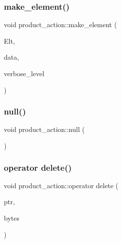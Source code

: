 \mbox{\label{classproduct__action_a1d16f9f3a4be7b3ed6ce0825612a3cd8}} 
\subsubsection{\texorpdfstring{make\+\_\+element()}{make\_element()}}
{\footnotesize\ttfamily void product\+\_\+action\+::make\+\_\+element (\begin{DoxyParamCaption}\item[{\mbox{\hyperlink{galois_8h_a09fddde158a3a20bd2dcadb609de11dc}{I\+NT}} $\ast$}]{Elt,  }\item[{\mbox{\hyperlink{galois_8h_a09fddde158a3a20bd2dcadb609de11dc}{I\+NT}} $\ast$}]{data,  }\item[{\mbox{\hyperlink{galois_8h_a09fddde158a3a20bd2dcadb609de11dc}{I\+NT}}}]{verbose\+\_\+level }\end{DoxyParamCaption})}

\mbox{\label{classproduct__action_a5a8a4c983398ab1ff4fcd6bd30d17a31}} 
\subsubsection{\texorpdfstring{null()}{null()}}
{\footnotesize\ttfamily void product\+\_\+action\+::null (\begin{DoxyParamCaption}{ }\end{DoxyParamCaption})}

\mbox{\label{classproduct__action_a576a86e22cae457ec3b34f5f7e927d13}} 
\subsubsection{\texorpdfstring{operator delete()}{operator delete()}}
{\footnotesize\ttfamily void product\+\_\+action\+::operator delete (\begin{DoxyParamCaption}\item[{void $\ast$}]{ptr,  }\item[{size\+\_\+t}]{bytes }\end{DoxyParamCaption})}

